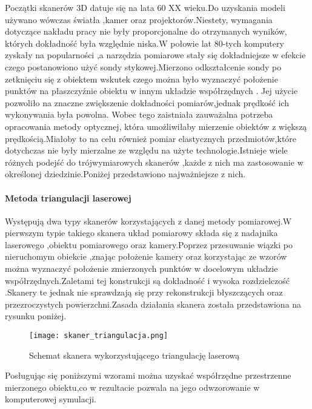 \documentclass[12pt]{article}
\begin{document}
Początki skanerów 3D datuje się na lata 60 XX wieku.Do uzyskania modeli używano wówczas światła ,kamer oraz projektorów.Niestety, wymagania dotyczące nakładu pracy nie były proporcjonalne do otrzymanych wyników, których dokładność była względnie niska.W połowie lat 80-tych komputery zyskały na popularności ,a narzędzia pomiarowe stały się dokładniejsze w efekcie czego postanowiono użyć sondy stykowej.Mierzono odkształcenie sondy po zetknięciu się z obiektem wskutek czego można było wyznaczyć położenie punktów na płaszczyźnie obiektu w innym układzie współrzędnych \cite{abdel20113d}.  Jej użycie pozwoliło na znaczne zwiększenie dokładności pomiarów,jednak prędkość ich wykonywania była powolna. Wobec tego zaistniała zauważalna potrzeba opracowania metody optycznej, która umożliwiłaby mierzenie obiektów z większą prędkością.Miałoby to na celu również pomiar elastycznych przedmiotów,które dotychczas nie były mierzalne ze względu na użyte technologie.Istnieje wiele różnych podejść do trójwymiarowych skanerów ,każde z nich ma zastosowanie w określonej dziedzinie.Poniżej przedstawiono najważniejsze z nich.

\paragraph{Metoda triangulacji laserowej\newline}
Występują dwa typy skanerów korzystających z danej metody pomiarowej.W pierwszym typie takiego skanera układ pomiarowy składa się z nadajnika laserowego ,obiektu pomiarowego oraz kamery.Poprzez przesuwanie wiązki po nieruchomym obiekcie ,znając położenie kamery oraz korzystając ze wzorów \cite{mikulski2013metody} można wyznaczyć położenie zmierzonych punktów w docelowym układzie współrzędnych.Zaletami tej konstrukcji są dokładność i wysoka rozdzielczość \cite{nowacki2018pomiar}.Skanery te jednak nie sprawdzają się przy rekonstrukcji błyszczących oraz przezroczystych powierzchni.Zasada działania skanera została przedstawiona na rysunku poniżej.

\begin{figure}[H]
  \centering
  \texttt{[image: skaner\_triangulacja.png]}
  \caption{Schemat skanera wykorzystującego triangulację laserową \cite{mikulski2013metody}}   
  \label{fig:picture}
\end{figure}

Posługując się poniższymi wzorami można uzyskać współrzędne przestrzenne mierzonego obiektu,co w rezultacie pozwala na jego odwzorowanie w komputerowej symulacji.
\end{document}
